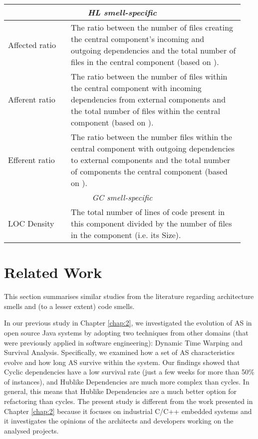 \begin{table}[tbp]
\begin{tabular}{p{0.25\linewidth}|p{0.69\linewidth}}
        \multicolumn{2}{c}{\itshape HL smell-specific}\\\midrule
        Affected ratio & The ratio between the number of files creating the central component's incoming and outgoing dependencies and the total number of files in the central component (based on \cite{Abdeen2011}). \\  
        Afferent ratio & The ratio between the number of files within the central component with incoming dependencies from external components and the total number of files within the central component (based on \cite{Abdeen2011}). \\ 
        Efferent ratio & The ratio between the number files within the central component with outgoing dependencies to external components and the total number of components the central component (based on \cite{Abdeen2011}). \\\midrule
        \multicolumn{2}{c}{\itshape GC smell-specific}\\\midrule
        LOC Density & The total number of lines of code present in this component divided by the number of files in the component (i.e. its Size). \\ \bottomrule
    \end{tabular}
\end{table}


\section{Related Work}\label{c4:sec:related-work}
This section summarises similar studies from the literature regarding architecture smells and (to a lesser extent) code smells.

In our previous study in Chapter \ref{chap:2}, we investigated the evolution of AS in open source Java systems by adopting two techniques from other domains (that were previously applied in software engineering): Dynamic Time Warping and Survival Analysis. Specifically, we examined how a set of AS characteristics evolve and how long AS survive within the system.
Our findings showed that Cyclic dependencies have a low survival rate (just a few weeks for more than 50\% of instances), and Hublike Dependencies are much more complex than cycles. In general, this means that Hublike Dependencies are a much better option for refactoring than cycles. 
The present study is different from the work presented in Chapter \ref{chap:2} because it focuses on industrial C/C++ embedded systems and it investigates the opinions of the architects and developers working on the analysed projects.

